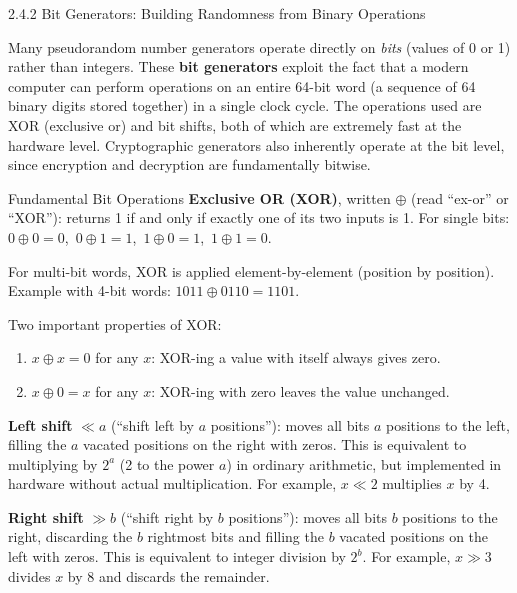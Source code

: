 \documentclass[aspectratio=169,10pt]{beamer}
\begin{document}
\begin{frame}[allowframebreaks]{2.4.2 Bit Generators: Building Randomness from Binary Operations}

Many pseudorandom number generators operate directly on \emph{bits} (values
of 0 or 1) rather than integers.  These \textbf{bit generators} exploit the
fact that a modern computer can perform operations on an entire 64-bit word
(a sequence of 64 binary digits stored together) in a single clock cycle.
The operations used are XOR (exclusive or) and bit shifts, both of which are
extremely fast at the hardware level.  Cryptographic generators also
inherently operate at the bit level, since encryption and decryption are
fundamentally bitwise.

\begin{block}{Fundamental Bit Operations}
\textbf{Exclusive OR (XOR)}, written $\oplus$ (read ``ex-or'' or ``XOR''):
returns 1 if and only if exactly one of its two inputs is 1.  For single
bits: $0 \oplus 0 = 0$,\ $0 \oplus 1 = 1$,\ $1 \oplus 0 = 1$,\
$1 \oplus 1 = 0$.

For multi-bit words, XOR is applied element-by-element (position by position).
Example with 4-bit words: $1011 \oplus 0110 = 1101$.

Two important properties of XOR:
\begin{enumerate}
  \item $x \oplus x = 0$ for any $x$: XOR-ing a value with itself always
    gives zero.
  \item $x \oplus 0 = x$ for any $x$: XOR-ing with zero leaves the value
    unchanged.
\end{enumerate}

\textbf{Left shift} $\ll a$ (``shift left by $a$ positions''): moves all
bits $a$ positions to the left, filling the $a$ vacated positions on the
right with zeros.  This is equivalent to multiplying by $2^a$ (2 to the
power $a$) in ordinary arithmetic, but implemented in hardware without
actual multiplication.  For example, $x \ll 2$ multiplies $x$ by 4.

\textbf{Right shift} $\gg b$ (``shift right by $b$ positions''): moves all
bits $b$ positions to the right, discarding the $b$ rightmost bits and
filling the $b$ vacated positions on the left with zeros.  This is
equivalent to integer division by $2^b$.  For example, $x \gg 3$ divides
$x$ by 8 and discards the remainder.
\end{block}


\end{frame}
\end{document}
